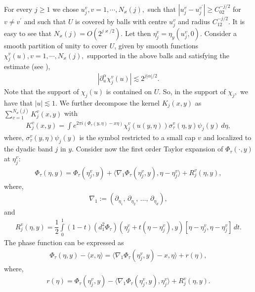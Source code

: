 \documentclass[12pt, reqno]{amsart}
\theoremstyle{definition}
\theoremstyle{remark}
\numberwithin{equation}{section}
\begin{document}
For every $j\ge 1$ we chose $u^v_j, v=1,\cdots,N_\varkappa(j),$ such that $|u_j^v-u_j^{v^{\prime}}|\ge C_02^{-j/2}$ for $v\neq v^{\prime}$ and such that $U$ is covered by balls with centre $u_j^v$ and radius $C_12^{-j/2}$. It is easy to see that $N_\varkappa(j)=O(2^{j\varkappa/2})$. Let then $\eta_j^v=\eta_y(u_j^v,0)$. Consider a smooth partition of unity to cover $U$, given by smooth functions $\chi_j^v(u), v=1,\cdots,N_\varkappa(j),$ supported in the above balls and satisfying the estimate (see \cite{Nicola2010}),
\begin{align*}
    |\partial_u^{\alpha}\chi_j^v(u)|\lesssim 2^{j|\alpha|/2}.
\end{align*} Note that the support of $\chi_j(u)$ is contained on $U.$ So, in the support of $\chi_j,$ we have that $|u|\lesssim 1.$
    We further decompose the kernel $K_j(x,y)$ as $\sum_{v=1}^{N_\varkappa(j)}K_j^v(x,y)$ with 
    \begin{align}
        K_j^v(x,y)=  \displaystyle{\int}e^{2\pi i (\Phi_{\tau}(y,\eta)-x\eta)}\chi_j^v(u(y,\eta))\sigma_{\tau}^v(\eta,y)\psi_j(y)\,d\eta, \label{76}
    \end{align}
 where, $\sigma_{\tau}^v(y,\eta)\psi_j(y)$ is the symbol    restricted to a small cap  $v$  and localized to the dyadic band  $j$ in  $y$.
Consider now the first order Taylor expansion of $\Phi_{\tau}(\cdot,y)$ at $\eta^v_j$:
\begin{align*}
    \Phi_{\tau}(\eta,y)=\Phi_{\tau}(\eta_j^v,y)+\langle \nabla_1 \Phi_{\tau}(\eta_j^v,y) ,\eta-\eta_j^v\rangle+R_j^v(\eta,y),
\end{align*}
where, \begin{align*}
\nabla_1 := (\partial_{\eta_1},\,\partial_{\eta_2},\,\ldots,\,\partial_{\eta_d}),
\end{align*}
and
\begin{align*}
    R_j^v(\eta,y)=\dfrac{1}{2}\int\limits_0^1(1-t)(d_1^2\Phi_{\tau})(\eta^v_j+t(\eta-\eta_j^v),y)[\eta-\eta_j^v,\eta-\eta_j^v]\,dt.
\end{align*}
The phase function can be expressed as 
\begin{align*}
    \Phi_{\tau}(\eta,y)-\langle x,\eta \rangle= \langle \nabla_1\Phi_{\tau}(\eta_j^v,y)-x,\eta\rangle + r(\eta),
\end{align*}
where,
\begin{align*}
    r(\eta)= \Phi_{\tau}(\eta_j^v,y)-\langle \nabla_1\Phi_{\tau}(\eta_j^v,y),\eta_j^v\rangle+R_j^v(\eta,y).
\end{align*}
\end{document}
